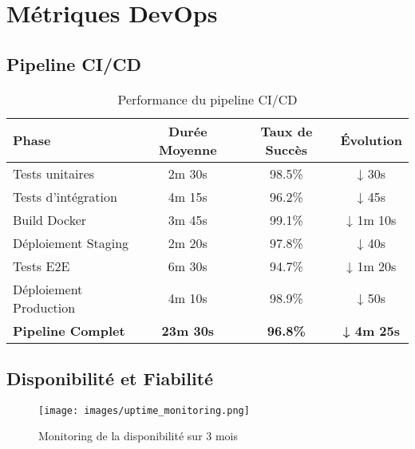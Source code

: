 \section{Métriques DevOps}

\subsection{Pipeline CI/CD}

\begin{table}[H]
    \centering
    \begin{tabularx}{\textwidth}{|l|c|c|c|}
        \hline
        \textbf{Phase} & \textbf{Durée Moyenne} & \textbf{Taux de Succès} & \textbf{Évolution} \\
        \hline
        Tests unitaires & 2m 30s & 98.5\% & ↓ 30s \\
        \hline
        Tests d'intégration & 4m 15s & 96.2\% & ↓ 45s \\
        \hline
        Build Docker & 3m 45s & 99.1\% & ↓ 1m 10s \\
        \hline
        Déploiement Staging & 2m 20s & 97.8\% & ↓ 40s \\
        \hline
        Tests E2E & 6m 30s & 94.7\% & ↓ 1m 20s \\
        \hline
        Déploiement Production & 4m 10s & 98.9\% & ↓ 50s \\
        \hline
        \textbf{Pipeline Complet} & \textbf{23m 30s} & \textbf{96.8\%} & \textbf{↓ 4m 25s} \\
        \hline
    \end{tabularx}
    \caption{Performance du pipeline CI/CD}
    \label{tab:cicd_metrics}
\end{table}

\subsection{Disponibilité et Fiabilité}

\begin{figure}[H]
    \centering
    \texttt{[image: images/uptime\_monitoring.png]}
    \caption{Monitoring de la disponibilité sur 3 mois}
    \label{fig:uptime_monitoring}
\end{figure}

